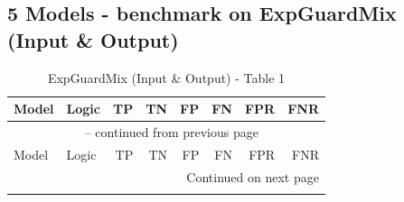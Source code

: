 \documentclass{article}
\begin{document}

\subsection{5 Models - benchmark on ExpGuardMix (Input \& Output)}

{\small
\begin{longtable}{llrrrrrr}
\caption{ExpGuardMix (Input \& Output) - Table 1} \label{tab:5models} \\
 
\toprule
Model & Logic & TP & TN & FP & FN & FPR & FNR \\
\midrule
\endfirsthead
 
\multicolumn{8}{c}{\tablename\ \thetable{} -- continued from previous page} \\
\toprule
Model & Logic & TP & TN & FP & FN & FPR & FNR \\
\midrule
\endhead
 
\midrule
\multicolumn{8}{r}{Continued on next page} \\
\endfoot
 
\bottomrule
\endlastfoot


\end{longtable}}
\end{document}
